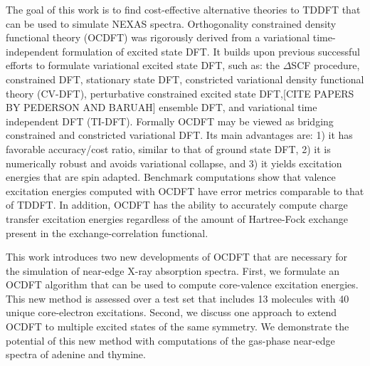 \documentclass[12pt]{article}
\begin{document}
The goal of this work is to find cost-effective alternative theories to TDDFT that can be used to simulate NEXAS spectra.
Orthogonality constrained density functional theory (OCDFT)\cite{evangelista_orthogonality_2013}  was rigorously derived from a variational time-independent formulation of excited state DFT.
It builds upon previous successful efforts to formulate variational excited state DFT, such as: the $\Delta$SCF procedure, \cite{kowalczyk_assessment_2011,ziegler_calculation_1977} constrained DFT,\cite{wu_constrained_2006} stationary state DFT, \cite{gorling_density-functional_1999}  constricted variational density functional theory (CV-DFT), \cite{ziegler_relation_2009,ziegler_application_2011,krykunov_self-consistent_2013,ziegler_implementation_2012}
perturbative constrained excited state DFT,\cite{}[CITE PAPERS BY PEDERSON AND BARUAH] ensemble DFT,\cite{theophilou_energy_1979,fritsche_generalized_1986,gross_rayleigh-ritz_1988,gross_density-functional_1988} and variational time independent DFT (TI-DFT). \cite{levy_variational_1999,nagy_variational_2001}
Formally OCDFT may be viewed as bridging constrained and constricted variational DFT.  Its main advantages are: 1) it has favorable accuracy/cost ratio, similar to that of ground state DFT, 2) it is numerically robust and avoids variational collapse, and 3) it yields excitation energies that are spin adapted.
Benchmark computations\cite{evangelista_orthogonality_2013} show that valence excitation energies computed with OCDFT have error metrics comparable to that of TDDFT.  In addition, OCDFT has the ability to accurately compute charge transfer excitation energies regardless of the amount of Hartree-Fock exchange present in the exchange-correlation functional.

This work introduces two new developments of OCDFT that are necessary for the simulation of near-edge X-ray  absorption spectra.
First, we formulate an OCDFT algorithm that can be used to compute core-valence excitation energies.  This new method is assessed over a test set that includes 13 molecules with 40 unique core-electron excitations.
Second, we discuss one approach to extend OCDFT to multiple excited states of the same symmetry.
We demonstrate the potential of this new method with computations of the gas-phase near-edge spectra of adenine and thymine.
\end{document}
